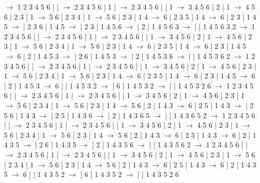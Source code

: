\documentclass{article}
\begin{document}
\newline
 $\rightarrow$ 1 2 3 4 5 6 |  |  $\rightarrow$ 2 3 4 5 6 | 1 |  $\rightarrow$ 2 3 4 5 6 |  | 1 $\rightarrow$ 3 4 5 6 | 2 | 1 $\rightarrow$ 4 5 6 | 2 3 | 1 $\rightarrow$ 5 6 | 2 3 4 | 1 $\rightarrow$ 5 6 | 2 3 | 1 4 $\rightarrow$ 6 | 2 3 5 | 1 4 $\rightarrow$ 6 | 2 3 | 1 4 5 $\rightarrow$  | 2 3 6 | 1 4 5 $\rightarrow$  | 2 3 | 1 4 5 6 $\rightarrow$  | 2 | 1 4 5 6 3 $\rightarrow$  |  | 1 4 5 6 3 2
\newline
 $\rightarrow$ 1 2 3 4 5 6 |  |  $\rightarrow$ 2 3 4 5 6 | 1 |  $\rightarrow$ 2 3 4 5 6 |  | 1 $\rightarrow$ 3 4 5 6 | 2 | 1 $\rightarrow$ 4 5 6 | 2 3 | 1 $\rightarrow$ 5 6 | 2 3 4 | 1 $\rightarrow$ 5 6 | 2 3 | 1 4 $\rightarrow$ 6 | 2 3 5 | 1 4 $\rightarrow$ 6 | 2 3 | 1 4 5 $\rightarrow$ 6 | 2 | 1 4 5 3 $\rightarrow$  | 2 6 | 1 4 5 3 $\rightarrow$  | 2 | 1 4 5 3 6 $\rightarrow$  |  | 1 4 5 3 6 2
\newline
 $\rightarrow$ 1 2 3 4 5 6 |  |  $\rightarrow$ 2 3 4 5 6 | 1 |  $\rightarrow$ 2 3 4 5 6 |  | 1 $\rightarrow$ 3 4 5 6 | 2 | 1 $\rightarrow$ 4 5 6 | 2 3 | 1 $\rightarrow$ 5 6 | 2 3 4 | 1 $\rightarrow$ 5 6 | 2 3 | 1 4 $\rightarrow$ 6 | 2 3 5 | 1 4 $\rightarrow$ 6 | 2 3 | 1 4 5 $\rightarrow$ 6 | 2 | 1 4 5 3 $\rightarrow$ 6 |  | 1 4 5 3 2 $\rightarrow$  | 6 | 1 4 5 3 2 $\rightarrow$  |  | 1 4 5 3 2 6
\newline
 $\rightarrow$ 1 2 3 4 5 6 |  |  $\rightarrow$ 2 3 4 5 6 | 1 |  $\rightarrow$ 2 3 4 5 6 |  | 1 $\rightarrow$ 3 4 5 6 | 2 | 1 $\rightarrow$ 4 5 6 | 2 3 | 1 $\rightarrow$ 5 6 | 2 3 4 | 1 $\rightarrow$ 5 6 | 2 3 | 1 4 $\rightarrow$ 5 6 | 2 | 1 4 3 $\rightarrow$ 6 | 2 5 | 1 4 3 $\rightarrow$  | 2 5 6 | 1 4 3 $\rightarrow$  | 2 5 | 1 4 3 6 $\rightarrow$  | 2 | 1 4 3 6 5 $\rightarrow$  |  | 1 4 3 6 5 2
\newline
 $\rightarrow$ 1 2 3 4 5 6 |  |  $\rightarrow$ 2 3 4 5 6 | 1 |  $\rightarrow$ 2 3 4 5 6 |  | 1 $\rightarrow$ 3 4 5 6 | 2 | 1 $\rightarrow$ 4 5 6 | 2 3 | 1 $\rightarrow$ 5 6 | 2 3 4 | 1 $\rightarrow$ 5 6 | 2 3 | 1 4 $\rightarrow$ 5 6 | 2 | 1 4 3 $\rightarrow$ 6 | 2 5 | 1 4 3 $\rightarrow$ 6 | 2 | 1 4 3 5 $\rightarrow$  | 2 6 | 1 4 3 5 $\rightarrow$  | 2 | 1 4 3 5 6 $\rightarrow$  |  | 1 4 3 5 6 2
\newline
 $\rightarrow$ 1 2 3 4 5 6 |  |  $\rightarrow$ 2 3 4 5 6 | 1 |  $\rightarrow$ 2 3 4 5 6 |  | 1 $\rightarrow$ 3 4 5 6 | 2 | 1 $\rightarrow$ 4 5 6 | 2 3 | 1 $\rightarrow$ 5 6 | 2 3 4 | 1 $\rightarrow$ 5 6 | 2 3 | 1 4 $\rightarrow$ 5 6 | 2 | 1 4 3 $\rightarrow$ 6 | 2 5 | 1 4 3 $\rightarrow$ 6 | 2 | 1 4 3 5 $\rightarrow$ 6 |  | 1 4 3 5 2 $\rightarrow$  | 6 | 1 4 3 5 2 $\rightarrow$  |  | 1 4 3 5 2 6
\end{document}

